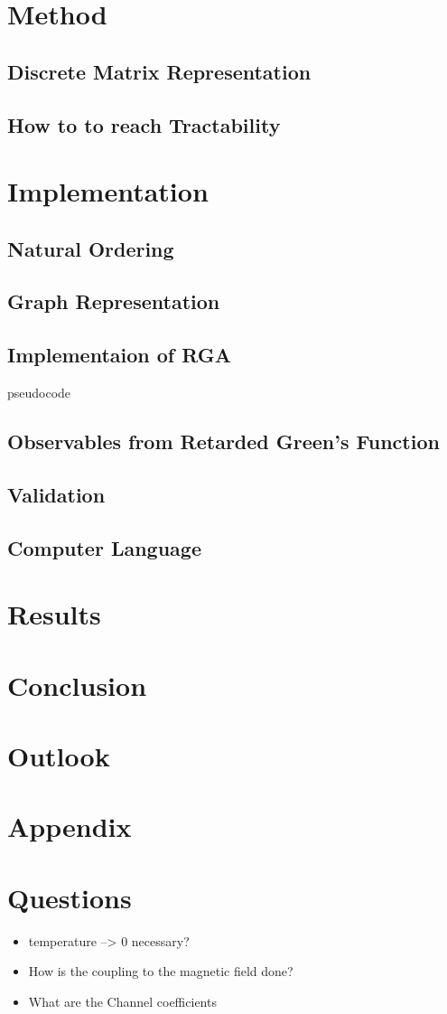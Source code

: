 \section{Method}
  \subsection{Discrete Matrix Representation}
  
  \subsection{How to to reach Tractability}
  
\section{Implementation}
\subsection{Natural Ordering}
\subsection{Graph Representation}
\subsection{Implementaion of RGA}
pseudocode
\subsection{Observables from Retarded Green's Function}
\subsection{Validation}
\subsection{Computer Language}
\section{Results}
\section{Conclusion}
\section{Outlook}
\section{Appendix}

\section{Questions}
\begin{itemize}
  \item temperature --> 0 necessary?
  \item How is the coupling to the magnetic field done?
  \item What are the Channel coefficients \cite{PhysRevB.31.6207}
\end{itemize}

\clearpage




